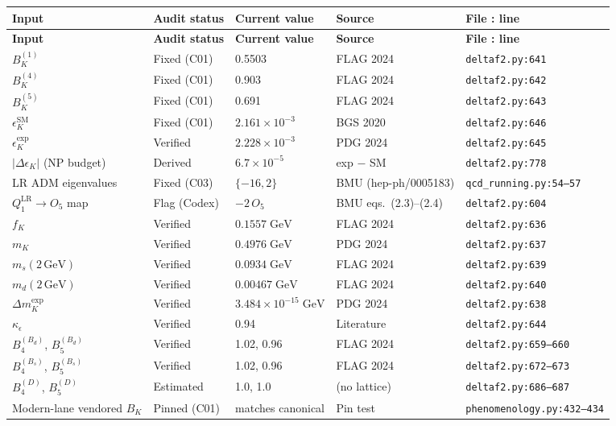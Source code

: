 \documentclass[11pt]{article}
\newcommand{\eK}{\epsilon_K}
\newcommand{\DeK}{\Delta\eK}
\begin{document}
\begin{longtable}{@{}p{2.6cm}p{2cm}p{2.2cm}p{2.2cm}p{3.8cm}@{}}
\toprule
\textbf{Input} & \textbf{Audit status} &
  \textbf{Current value} & \textbf{Source} &
  \textbf{File : line} \\
\midrule
\endfirsthead
\toprule
\textbf{Input} & \textbf{Audit status} &
  \textbf{Current value} & \textbf{Source} &
  \textbf{File : line} \\
\midrule
\endhead
$B_K^{(1)}$ &
  Fixed (C01) &
  0.5503 &
  FLAG 2024 &
  \texttt{deltaf2.py:641} \\
$B_K^{(4)}$ &
  Fixed (C01) &
  0.903 &
  FLAG 2024 &
  \texttt{deltaf2.py:642} \\
$B_K^{(5)}$ &
  Fixed (C01) &
  0.691 &
  FLAG 2024 &
  \texttt{deltaf2.py:643} \\
$\eK^{\mathrm{SM}}$ &
  Fixed (C01) &
  $2.161\times10^{-3}$ &
  BGS 2020 &
  \texttt{deltaf2.py:646} \\
$\eK^{\mathrm{exp}}$ &
  Verified &
  $2.228\times10^{-3}$ &
  PDG 2024 &
  \texttt{deltaf2.py:645} \\
$|\DeK|$ (NP budget) &
  Derived &
  $6.7\times10^{-5}$ &
  exp $-$ SM &
  \texttt{deltaf2.py:778} \\
LR ADM eigenvalues &
  Fixed (C03) &
  $\{-16, 2\}$ &
  BMU (hep-ph/0005183) &
  \texttt{qcd\_running.py:54--57} \\
$Q_1^{\mathrm{LR}} \!\to\! O_5$ map &
  Flag (Codex) &
  $-2\,O_5$ &
  BMU eqs.~(2.3)--(2.4) &
  \texttt{deltaf2.py:604} \\
$f_K$ &
  Verified &
  $0.1557\;\mathrm{GeV}$ &
  FLAG 2024 &
  \texttt{deltaf2.py:636} \\
$m_K$ &
  Verified &
  $0.4976\;\mathrm{GeV}$ &
  PDG 2024 &
  \texttt{deltaf2.py:637} \\
$m_s(2\,\mathrm{GeV})$ &
  Verified &
  $0.0934\;\mathrm{GeV}$ &
  FLAG 2024 &
  \texttt{deltaf2.py:639} \\
$m_d(2\,\mathrm{GeV})$ &
  Verified &
  $0.00467\;\mathrm{GeV}$ &
  FLAG 2024 &
  \texttt{deltaf2.py:640} \\
$\Delta m_K^{\mathrm{exp}}$ &
  Verified &
  $3.484\!\times\!10^{-15}\;\mathrm{GeV}$ &
  PDG 2024 &
  \texttt{deltaf2.py:638} \\
$\kappa_\epsilon$ &
  Verified &
  0.94 &
  Literature &
  \texttt{deltaf2.py:644} \\
$B_4^{(B_d)}$, $B_5^{(B_d)}$ &
  Verified &
  1.02, 0.96 &
  FLAG 2024 &
  \texttt{deltaf2.py:659--660} \\
$B_4^{(B_s)}$, $B_5^{(B_s)}$ &
  Verified &
  1.02, 0.96 &
  FLAG 2024 &
  \texttt{deltaf2.py:672--673} \\
$B_4^{(D)}$, $B_5^{(D)}$ &
  Estimated &
  1.0, 1.0 &
  (no lattice) &
  \texttt{deltaf2.py:686--687} \\
Modern-lane vendored $B_K$ &
  Pinned (C01) &
  matches canonical &
  Pin test &
  \texttt{phenomenology.py:432--434} \\
\bottomrule
\end{longtable}
\end{document}
